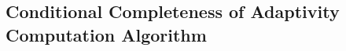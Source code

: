 \subsection{Conditional Completeness of Adaptivity Computation Algorithm}
\label{apdx:adaptalg_completeness}

\clearpage

% 
% 

% 
% 

% 
% 

% 
\clearpage